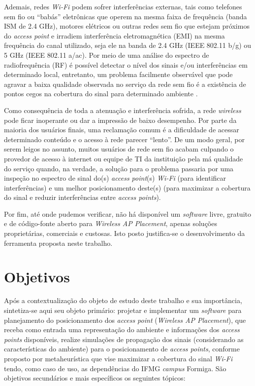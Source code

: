 \documentclass[
	12pt,				%
	twoside,			%
	a4paper,			%
	english,			%
	french,				%
	spanish,			%
	brazil				%
	]{abntex2}
\begin{document}
Ademais, redes \emph{Wi-Fi} podem sofrer interferências externas, tais
como telefones sem fio ou ``babás'' eletrônicas que operem na mesma
faixa de frequência (banda ISM de 2.4 GHz), motores elétricos ou outras
redes sem fio que estejam próximos do \emph{access point} e irradiem
interferência eletromagnética (EMI) na mesma frequência do canal
utilizado, seja ele na banda de 2.4 GHz (IEEE 802.11 b/g) ou 5 GHz (IEEE
802.11 a/ac). Por meio de uma análise do espectro de radiofrequência
(RF) é possível detectar o nível dos sinais e/ou interferências em
determinado local, entretanto, um problema facilmente observável que
pode agravar a baixa qualidade observada no serviço da rede sem fio é a
existência de pontos cegos na cobertura do sinal para determinado
ambiente \cite{RUBINSTEINS}.

Como consequência de toda a atenuação e interferência sofrida, a rede
\emph{wireless} pode ficar inoperante ou dar a impressão de baixo
desempenho. Por parte da maioria dos usuários finais, uma reclamação
comum é a dificuldade de acessar determinado conteúdo e o acesso à rede
parecer ``lento''. De um modo geral, por serem leigos no assunto, muitos
usuários de rede sem fio acabam culpando o provedor de acesso à internet
ou equipe de TI da instituição pela má qualidade do serviço quando, na
verdade, a solução para o problema passaria por uma inspeção no espectro
de sinal do(s) \emph{access point}(s) \emph{Wi-Fi} (para identificar
interferências) e um melhor posicionamento deste(s) (para maximizar a
cobertura do sinal e reduzir interferências entre \emph{access points}).

Por fim, até onde pudemos verificar, não há disponível um
\emph{software} livre, gratuito e de código-fonte aberto para
\emph{Wireless AP Placement}, apenas soluções proprietárias, comerciais
e custosas. Isto posto justifica-se o desenvolvimento da ferramenta
proposta neste trabalho.

\section{Objetivos}\label{objetivos}

Após a contextualização do objeto de estudo deste trabalho e sua
importância, sintetiza-se aqui seu objeto primário: projetar e
implementar um \emph{software} para planejamento do posicionamento dos
\emph{access point} (\emph{Wireless AP Placement}), que receba como
entrada uma representação do ambiente e informações dos \emph{access
points} disponíveis, realize simulações de propagação dos sinais
(considerando as características do ambiente) para o posicionamento de
\emph{access points}, conforme proposto por metaheurística que vise
maximizar a cobertura do sinal \emph{Wi-Fi} tendo, como caso de uso, as
dependências do IFMG \emph{campus} Formiga. São objetivos secundários e
mais específicos os seguintes tópicos:
\end{document}
